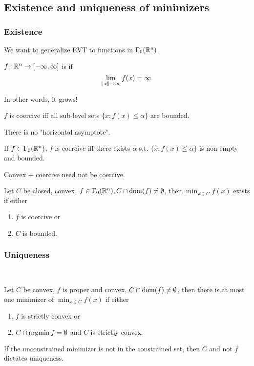 \documentclass[class=article,crop=false]{standalone}
\begin{document}
\subsection{Existence and uniqueness of minimizers}
\subsubsection{Existence}
\begin{intuition}
	We want to generalize EVT to functions in $ \Gamma_0(\mathbb{R}^{n})$.
\end{intuition}
\begin{defn}[coercive]
	$ f: \mathbb{R}^{n} \to [-\infty,\infty]$ is  if
	\[
		\lim_{ \norm{ x}  \to \infty} f(x) = \infty
	.\] 
\end{defn}
\begin{note}
In other words, it grows!
\end{note}
\begin{prop}
	$ f$ is coercive iff all sub-level sets  $ \{x: f(x) \leq \alpha\} $ are bounded.
\end{prop}
\begin{intuition}
	There is no "horizontal asymptote".
\end{intuition}
\begin{prop}
	If $ f \in \Gamma_0 (\mathbb{R}^{n})$, $ f$ is coercive iff there exists  $ \alpha$ s.t. $ \{x:f(x) \leq \alpha\} $ is non-empty and bounded.
\end{prop}

\begin{remark}
Convex + coercive need not be coercive.
\end{remark}

\begin{thm}[existence]
	Let $ C$ be closed, convex, $ f \in \Gamma_0(\mathbb{R}^{n}), C \cap \operatorname{dom}(f) \neq \emptyset$, then $ \min_{x \in C} f(x) $ exists if either
	\begin{enumerate}[label=\arabic*)]
		\item $ f$ is coercive or
		\item $ C$ is bounded.
	\end{enumerate}
\end{thm}

\subsubsection{Uniqueness}
~\begin{thm}[Uniqueness]
	Let $ C$ be convex,  $ f$ is proper and convex, $ C \cap \operatorname{dom}(f) \neq \emptyset$, then there is at most one minimizer of $ \min_{x \in C} f(x)$ if either
	\begin{enumerate}[label=\arabic*)]
		\item $ f$ is strictly convex or
		\item  $ C \cap  \operatorname*{argmin} f = \emptyset$ and $ C$ is strictly convex.
	\end{enumerate}
\end{thm}
\begin{intuition}
	If the unconstrained minimizer is not in the constrained set, then $ C$ and not $ f$ dictates uniqueness.
\end{intuition}
\end{document}
